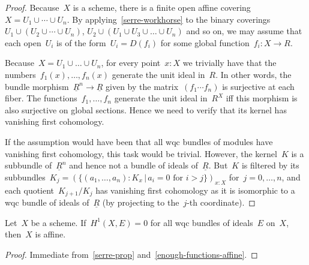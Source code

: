 \begin{proof}
  Because~$X$ is a scheme, there is a finite open affine covering~$X = U_1 \cup
  \cdots \cup U_n$. By applying~\cref{serre-workhorse} to the binary
  coverings~$U_1 \cup (U_2 \cup \cdots \cup U_n)$, $U_2 \cup (U_1 \cup U_3 \cup
  \ldots \cup U_n)$ and so on, we may assume that each open~$U_i$ is of the
  form~$U_i = D(f_i)$ for some global function~$f_i : X \to R$.

  Because~$X = U_1 \cup \dots \cup U_n$, for every point~$x : X$ we trivially
  have that the numbers~$f_1(x),\ldots,f_n(x)$ generate the unit ideal in~$R$.
  In other words, the bundle morphism~$\underline{R}^n \to \underline{R}$ given by
  the matrix~$(f_1 \cdots f_n)$ is surjective at each fiber. The
  functions~$f_1,\ldots,f_n$ generate the unit ideal in~$R^X$ iff this morphism
  is also surjective on global sections. Hence we need to verify that its
  kernel has vanishing first cohomology.

  If the assumption would have been that all wqc bundles of modules have
  vanishing first cohomology, this task would be trivial. However, the
  kernel~$K$ is a subbundle of~$\underline{R}^n$ and hence not a bundle of
  ideals of~$\underline{R}$. But~$K$ is filtered by its subbundles~$K_j = (\{
  (a_1,\ldots,a_n) : K_x \,|\, \text{$a_i = 0$ for~$i > j$} \})_{x:X}$ for~$j =
  0,\ldots,n$, and each quotient~$K_{j+1}/K_j$ has vanishing first cohomology
  as it is isomorphic to a wqc bundle of ideals of~$\underline{R}$ (by
  projecting to the~$j$-th coordinate).
\end{proof}

\begin{theorem}
  Let~$X$ be a scheme. If~$H^1(X, E) = 0$ for all wqc bundles of ideals~$E$
  on~$X$, then~$X$ is affine.
\end{theorem}

\begin{proof}
  Immediate from~\cref{serre-prop} and~\cref{enough-functions-affine}.
\end{proof}
